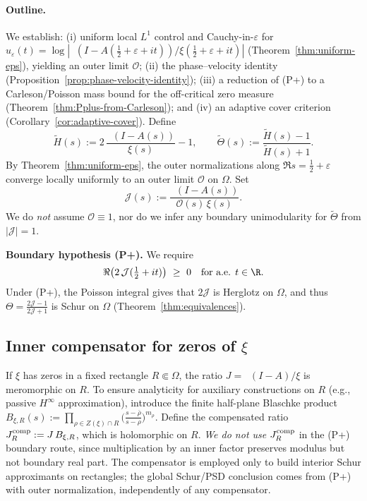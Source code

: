 \documentclass[11pt]{article}
\theoremstyle{remark}
\DeclareMathOperator{\dettwo}{det_2}
\begin{document}
\paragraph{Outline.}
We establish: (i) uniform local $L^1$ control and Cauchy-in-$\varepsilon$ for $u_\varepsilon(t)=\log|\dettwo(I-A(\tfrac12+\varepsilon+it))/\xi(\tfrac12+\varepsilon+it)|$ (Theorem~\ref{thm:uniform-eps}), yielding an outer limit \(\mathcal O\); (ii) the phase--velocity identity (Proposition~\ref{prop:phase-velocity-identity}); (iii) a reduction of (P+) to a Carleson/Poisson mass bound for the off-critical zero measure (Theorem~\ref{thm:Pplus-from-Carleson}); and (iv) an adaptive cover criterion (Corollary~\ref{cor:adaptive-cover}).
Define
\[
 \widetilde H(s):=2\,\frac{\dettwo(I-A(s))}{\xi(s)}-1,\qquad
 \widetilde\Theta(s):=\frac{\widetilde H(s)-1}{\widetilde H(s)+1}.
\]
By Theorem~\ref{thm:uniform-eps}, the outer normalizations along \(\Re s=\tfrac12+\varepsilon\) converge locally uniformly to an outer limit \(\mathcal O\) on \(\Omega\). Set
\[
 \mathcal J(s):=\frac{\dettwo(I-A(s))}{\mathcal O(s)\,\xi(s)}.
\]
We do \emph{not} assume \(\mathcal O\equiv 1\), nor do we infer any boundary unimodularity for \(\widetilde\Theta\) from \(|\mathcal J|=1\).

\medskip
\noindent\textbf{Boundary hypothesis (P+).} We require
\[
 \Re\big(2\,\mathcal J(\tfrac12+it)\big)\ \ge\ 0\quad\text{for a.e. }t\in\R.
\]
Under (P+), the Poisson integral gives that \(2\mathcal J\) is Herglotz on \(\Omega\), and thus
\(\Theta=\frac{2\mathcal J-1}{2\mathcal J+1}\) is Schur on \(\Omega\) (Theorem~\ref{thm:equivalences}).

\subsection{Inner compensator for zeros of \(\xi\)}\label{subsec:bl-compensator}
If \(\xi\) has zeros in a fixed rectangle \(R\Subset\Omega\), the ratio \(J=\dettwo(I-A)/\xi\) is meromorphic on \(R\).
To ensure analyticity for auxiliary constructions on \(R\) (e.g., passive \(H^\infty\) approximation), introduce the finite half-plane Blaschke product
\(
 B_{\xi,R}(s):=\prod_{\rho\in Z(\xi)\cap R} \big(\tfrac{s-\overline \rho}{s-\rho}\big)^{m_\rho}.
\)
Define the compensated ratio \(J_R^{\rm comp}:=J\,B_{\xi,R}\), which is holomorphic on \(R\).
\emph{We do not use} \(J_R^{\rm comp}\) in the (P+) boundary route, since multiplication by an inner factor preserves modulus but not boundary real part. The compensator is employed only to build interior Schur approximants on rectangles; the global Schur/PSD conclusion comes from (P+) with outer normalization, independently of any compensator.
\end{document}
